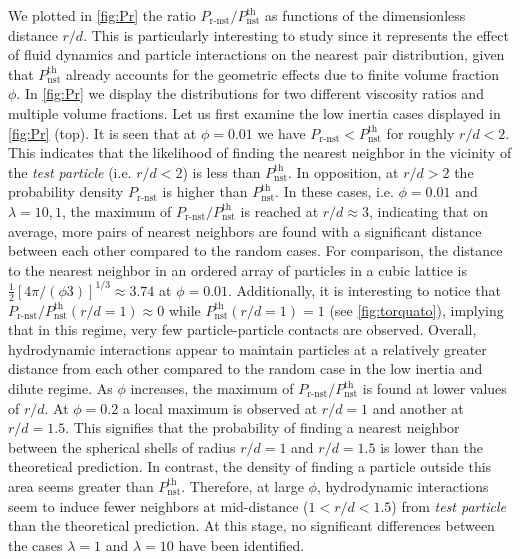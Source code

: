 We plotted in \ref{fig:Pr} the ratio $P_\text{r-nst}/P_\text{nst}^\text{th}$ as functions of the dimensionless distance $r/d$.
This is particularly interesting to study since it represents the effect of fluid dynamics and particle interactions on the nearest pair distribution, given that $P_\text{nst}^\text{th}$ already accounts for the geometric effects due to finite volume fraction $\phi$. 
In \ref{fig:Pr} we display the distributions for two different viscosity ratios and multiple volume fractions. 
Let us first examine the low inertia cases displayed in \ref{fig:Pr} (top). 
It is seen that at $\phi = 0.01$ we have $P_\text{r-nst} < P_\text{nst}^\text{th}$ for roughly $r/d < 2$.
This indicates that the likelihood of finding the nearest neighbor in the vicinity of the \textit{test particle} (i.e. $r/d<2$) is less than $P_\text{nst}^\text{th}$.
In opposition, at $r/d>2$ the probability density $P_\text{r-nst}$ is higher than $P_\text{nst}^\text{th}$.
In these cases, i.e. $\phi = 0.01$ and $\lambda = 10, 1$, the maximum of $P_\text{r-nst}/P_\text{nst}^\text{th}$ is reached at $r/d \approx 3$, indicating that on average, more pairs of nearest neighbors are found with a significant distance between each other compared to the random cases. 
For comparison, the distance to the nearest neighbor in an ordered array of particles in a cubic lattice is  $\frac{1}{2}\left[4\pi/(\phi 3)\right]^{1/3} \approx 3.74$ at $\phi = 0.01$.
Additionally, it is interesting to notice that $P_\text{r-nst}/P_\text{nst}^\text{th}(r/d =1) \approx 0$ while $P_\text{nst}^\text{th}(r/d =1) = 1$ (see \ref{fig:torquato}), implying that in this regime, very few particle-particle contacts are observed. 
Overall, hydrodynamic interactions appear to maintain particles at a relatively greater distance from each other compared to the random case in the low inertia and dilute regime.
As $\phi$ increases, the maximum of $P_\text{r-nst}/P_\text{nst}^\text{th}$ is found at lower values of $r/d$. 
At $\phi = 0.2$ a local maximum is observed at $r/d = 1$ and another at $r/d = 1.5$.
This signifies that the probability of finding a nearest neighbor between the spherical shells of radius $r/d = 1$ and $r/d = 1.5$ is lower than the theoretical prediction.
In contrast, the density of finding a particle outside this area seems greater than $P_\text{nst}^\text{th}$. 
Therefore, at large $\phi$, hydrodynamic interactions seem to induce fewer neighbors at mid-distance ($1<r/d<1.5$) from \textit{test particle} than the theoretical prediction. 
At this stage, no significant differences between the cases $\lambda = 1$ and $\lambda = 10$ have been identified.

